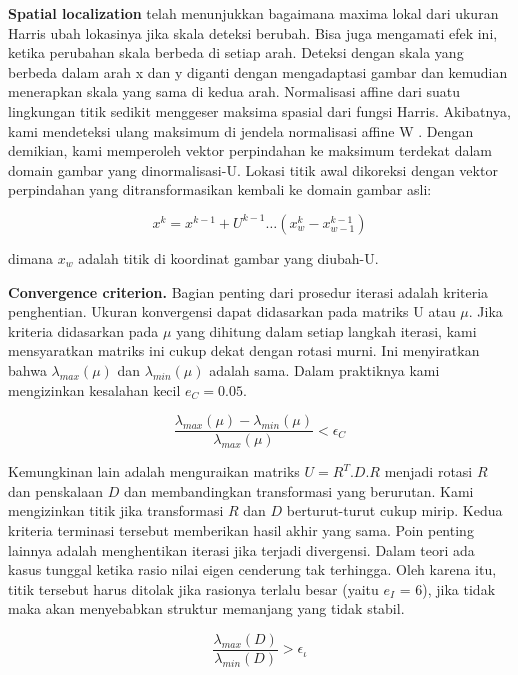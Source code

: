 \textbf{Spatial localization} telah menunjukkan bagaimana maxima lokal dari ukuran Harris ubah lokasinya jika skala deteksi berubah. 
Bisa juga mengamati efek ini, ketika perubahan skala berbeda di setiap arah. Deteksi dengan skala yang berbeda dalam arah x dan y diganti dengan mengadaptasi gambar dan kemudian menerapkan skala yang sama di kedua arah. Normalisasi affine dari suatu lingkungan titik sedikit menggeser maksima spasial dari fungsi Harris. Akibatnya, kami mendeteksi ulang maksimum di jendela normalisasi affine W . Dengan demikian, kami memperoleh vektor perpindahan ke maksimum terdekat dalam domain gambar yang dinormalisasi-U. Lokasi titik awal dikoreksi 
dengan vektor perpindahan yang ditransformasikan kembali ke domain gambar asli:

\begin{equation*}
  x^{k} = x^{k-1} + U^{k-1} \dots (x_{w}^{k} - x_{w-1}^{k-1})
\end{equation*}

dimana \(x_{w}\) adalah titik di koordinat gambar yang diubah-U.

\textbf{Convergence criterion.} Bagian penting dari prosedur iterasi adalah kriteria penghentian. 
Ukuran konvergensi dapat didasarkan pada matriks U atau \(\mu\). Jika kriteria didasarkan pada \(\mu\) yang 
dihitung dalam setiap langkah iterasi, kami mensyaratkan matriks ini cukup dekat dengan rotasi murni. 
Ini menyiratkan bahwa \(\lambda_{max}(\mu)\) dan \(\lambda_{min}(\mu)\) adalah sama. 
Dalam praktiknya kami mengizinkan kesalahan kecil \(e_{C}=0.05\).

\begin{equation}
  \frac{\lambda_{max}(\mu)-\lambda_{min}(\mu)}{\lambda_{max}(\mu)} < \epsilon_{C}
\end{equation}

Kemungkinan lain adalah menguraikan matriks \(U = R^{T}.D.R\) menjadi rotasi \(R\) dan penskalaan \(D\) dan membandingkan 
transformasi yang berurutan. Kami mengizinkan titik jika transformasi \(R\) dan \(D\) berturut-turut cukup mirip. 
Kedua kriteria terminasi tersebut memberikan hasil akhir yang sama. Poin penting lainnya adalah menghentikan iterasi jika 
terjadi divergensi. Dalam teori ada kasus tunggal ketika rasio nilai eigen cenderung tak terhingga. 
Oleh karena itu, titik tersebut harus ditolak jika rasionya terlalu besar (yaitu \(e_{I}\) = 6), 
jika tidak maka akan menyebabkan struktur memanjang yang tidak stabil.

\begin{equation}
  \frac{\lambda_{max}(D)}{\lambda_{min}(D)} > \epsilon_{\iota}
\end{equation}

